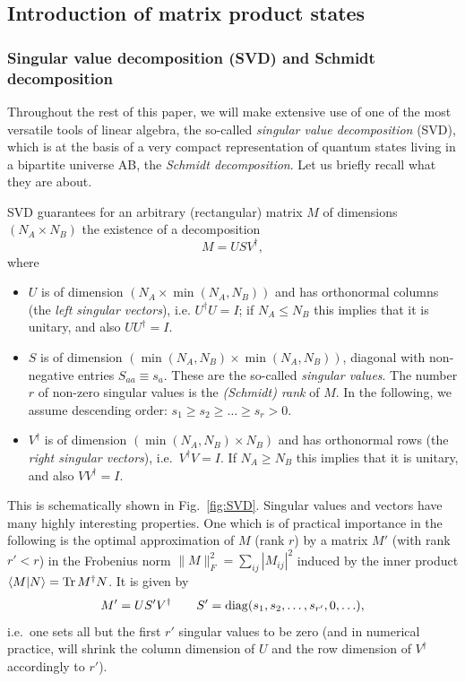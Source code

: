 \documentclass[a4paper,10pt,oneside,onecolumn,1p,times]{elsarticle}
\newcommand{\tr}{{\rm Tr }}
\newcommand{\braket}[2]{\mbox{$\langle #1  | #2 \rangle$}} 	%
\begin{document}
\subsection{Introduction of matrix product states}

\subsubsection{Singular value decomposition (SVD) and Schmidt decomposition}
Throughout the rest of this paper, we will make extensive use of one of the most versatile tools of linear algebra, the so-called {\em singular value decomposition} (SVD), which is at the basis of a very compact representation of quantum states living in a bipartite universe AB, the {\em Schmidt decomposition}. Let us briefly recall what they are about.

SVD guarantees for an arbitrary (rectangular) matrix $M$ of dimensions $(N_A \times N_B)$ the existence of a decomposition
\begin{equation}
M =   U S V^\dagger ,
\end{equation}
where 
\begin{itemize}
\item $U$ is of dimension $(N_A \times \min (N_A,N_B))$ and has orthonormal columns (the {\em left singular vectors}), i.e. $U^\dagger U = I$; if $N_A \leq N_B$ this implies that it is unitary, and also $UU^\dagger = I$. 
\item $S$ is of dimension $(\min (N_A,N_B) \times \min (N_A,N_B))$, diagonal with non-negative entries $S_{aa} \equiv s_a$. These are the so-called {\em singular values}. The number $r$ of non-zero singular values is the {\em (Schmidt) rank} of $M$. In the following, we assume descending order: $s_1 \geq s_2 \geq \ldots \geq s_r > 0.$
\item $V^\dagger$ is of dimension $(\min (N_A,N_B) \times N_B)$ and has orthonormal rows (the {\em right singular vectors}), i.e.\ $V^\dagger V = I$. If $N_A \geq N_B$ this implies that it is unitary, and also $VV^\dagger  = I$.
\end{itemize}
This is schematically shown in Fig.~\ref{fig:SVD}. Singular values and vectors have many highly interesting properties. One which is of practical importance in the following is the optimal approximation of $M$ (rank $r$) by a matrix $M'$ (with rank $r'<r$) in the Frobenius norm $\| M \|_F^2 = \sum_{ij} |M_{ij}|^2$ induced by the inner product $\braket{M}{N}= \tr\, M^\dagger N$. It is given by 
\begin{equation}
M' = U S' V^\dagger \quad\quad S'={\rm diag} (s_1, s_2, \ldots, s_{r'}, 0,\ldots ),
\end{equation} 
i.e.\ one sets all but the first $r'$ singular values to be zero (and in numerical practice, will shrink the column dimension of $U$ and the row dimension of $V^\dagger$ accordingly to $r'$).
\end{document}
